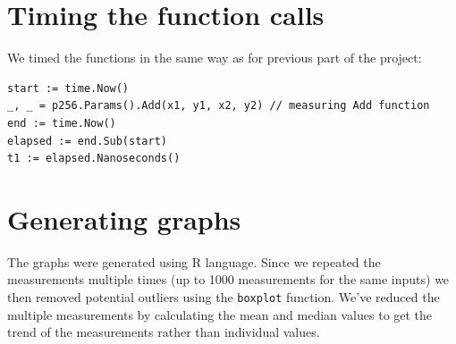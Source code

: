 \documentclass[a4paper]{scrartcl}
\begin{document}

\section{Timing the function calls}

We timed the functions in the same way as for previous part of the project:
\begin{lstlisting}[language=golang]
start := time.Now()
_, _ = p256.Params().Add(x1, y1, x2, y2) // measuring Add function
end := time.Now()
elapsed := end.Sub(start)
t1 := elapsed.Nanoseconds()
\end{lstlisting}

\section{Generating graphs}
The graphs were generated using R language. Since we repeated the measurements multiple times (up to 1000 measurements for the same inputs) we then removed potential outliers using the \verb+boxplot+ function. We've reduced the multiple measurements by calculating the mean and median values to get the trend of the measurements rather than individual values.
\end{document}
